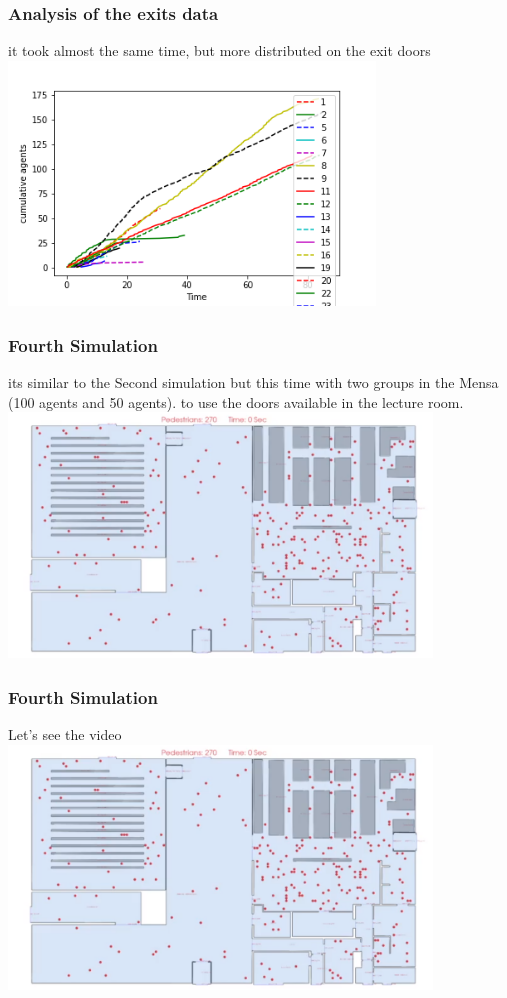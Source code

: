 \documentclass{beamer}
\begin{document}
\begin{frame}
\frametitle{Analysis of the exits data}
\raggedright
it took almost the same time, but more distributed on the exit doors 
\vspace{1em}
\centering
  \includegraphics[height=6.5cm]{results_goal_06.png}
\end{frame}

\begin{frame}
\frametitle{Fourth Simulation}
\raggedright
its similar to the Second simulation but this time with two groups in the Mensa (100 agents and 50 agents). to use the doors available in the lecture room.
\centering
\includegraphics[height=6.5cm]{02_simulation_start.png}
\end{frame}

\begin{frame}
\frametitle{Fourth Simulation}
\centering
Let's see the video
\includegraphics[height=6.5cm]{02_simulation_start.png}
\end{frame}
\end{document}
